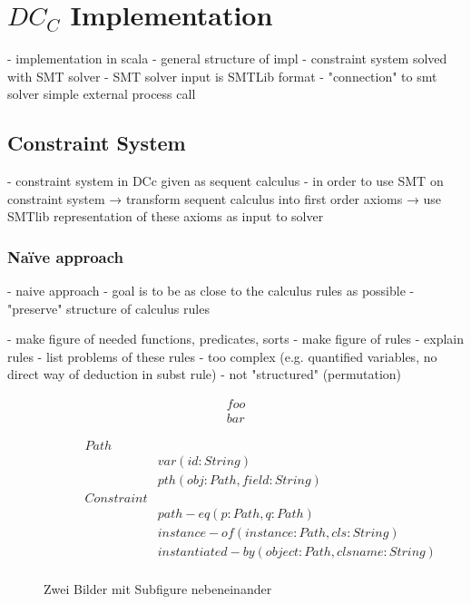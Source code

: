 \chapter{$DC_C$ Implementation}
- implementation in scala
- general structure of impl
  - constraint system solved with SMT solver
  - SMT solver input is SMTLib format
  - "connection" to smt solver simple external process call

\section{Constraint System}
- constraint system in DCc given as sequent calculus
- in order to use SMT on constraint system
  → transform sequent calculus into first order axioms
  → use SMTlib representation of these axioms as input to solver
\subsection{Na\"ive approach}
- naive approach
- goal is to be as close to the calculus rules as possible
- "preserve" structure of calculus rules

- make figure of needed functions, predicates, sorts
- make figure of rules
- explain rules
- list problems of these rules
  - too complex (e.g. quantified variables, no direct way of deduction in subst rule)
  - not "structured" (permutation)
  
  
\begin{figure}
\centering
\begin{subfigure}[c]{0.5\textwidth}
\centering
\begin{align*}
  foo\\
  bar
\end{align*}
\label{test-a}
\end{subfigure}
\begin{subfigure}[c]{0.5\textwidth}
\centering
\begin{align*}
\mathit{Path}\\
  &\mathit{var(id: String)}\\
  &\mathit{pth(obj: Path, field: String)}\\
\mathit{Constraint}\\
  &\mathit{path-eq(p: Path, q: Path)}\\
  &\mathit{instance-of(instance: Path, cls: String)}\\
  &\mathit{instantiated-by(object: Path, clsname: String)}\\
\end{align*}
\label{test-b}
\end{subfigure}
\caption{Zwei Bilder mit Subfigure nebeneinander}
\end{figure}
  

